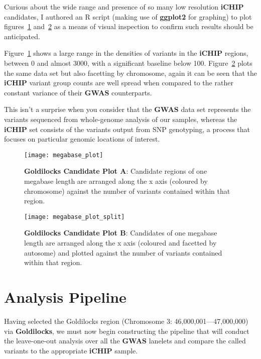 Curious about the wide range and presence of so many low resolution
\textbf{iCHIP} candidates, I authored an R script (making use of
\textbf{ggplot2}\citep{ggplot2} for graphing) to plot
figures~\ref{fig:megabaseplot} and~\ref{fig:megabaseplotsplit} as a means of
visual inspection to confirm such results should be anticipated.

Figure~\ref{fig:megabaseplot} shows a large range in the densities of
variants in the \textbf{iCHIP} regions, between 0 and almost 3000, with a
significant baseline below 100. Figure~\ref{fig:megabaseplotsplit} plots the
same data set but also facetting by chromosome, again it can be seen that the
\textbf{iCHIP} variant group counts are well spread when compared to the rather
constant variance of their \textbf{GWAS} counterparts.

This isn't a surprise when you consider that the \textbf{GWAS} data set
represents the variants sequenced from whole-genome analysis of our samples,
whereas the \textbf{iCHIP} set consists of the variants output from SNP
genotyping, a process that focuses on particular genomic locations of interest.


\begin{figure}[htbp!]
    \centering
    \texttt{[image: megabase\_plot]}
    \caption[megabaseplot]{\textbf{Goldilocks Candidate Plot A}: Candidate regions
    of one megabase length are arranged along the x axis (coloured by
chromosome) against the number of variants contained within that region.}
    \label{fig:megabaseplot}
\end{figure}
\begin{figure}[htbp!]
    \centering
    \texttt{[image: megabase\_plot\_split]}
    \caption[megabaseplotsplit]{\textbf{Goldilocks Candidate Plot B}: Candidates
        of one megabase length are arranged along the x axis (coloured
        and facetted by autosome) and plotted against the number of variants contained
    within that region.}
    \label{fig:megabaseplotsplit}
\end{figure}


\chapter{Analysis Pipeline}
\label{chap:pipeline}

Having selected the Goldilocks region (Chromosome 3: 46,000,001---47,000,000)
via \textbf{Goldilocks}, we must now begin constructing the pipeline that will
conduct the leave-one-out analysis over all the \textbf{GWAS} lanelets and
compare the called variants to the appropriate \textbf{iCHIP} sample.

